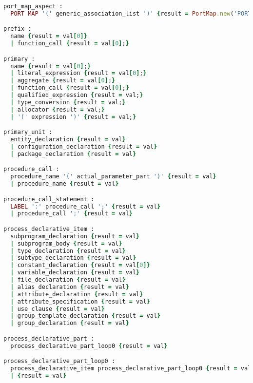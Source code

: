 \begin{lstlisting}[language=Ruby, style=rubystyle]
port_map_aspect :
  PORT MAP '(' generic_association_list ')' {result = PortMap.new('PORT', val[3]);}

prefix :
  name {result = val[0]}
  | function_call {result = val[0];}

primary :
  name {result = val[0];}
  | literal_expression {result = val[0];}
  | aggregate {result = val[0];}
  | function_call {result = val[0];}
  | qualified_expression {result = val;}
  | type_conversion {result = val;}
  | allocator {result = val;}
  | '(' expression ')' {result = val;}

primary_unit :
  entity_declaration {result = val}
  | configuration_declaration {result = val}
  | package_declaration {result = val}

procedure_call :
  procedure_name '(' actual_parameter_part ')' {result = val}
  | procedure_name {result = val}

procedure_call_statement :
  LABEL ':' procedure_call ';' {result = val}
  | procedure_call ';' {result = val}

process_declarative_item :
  subprogram_declaration {result = val}
  | subprogram_body {result = val}
  | type_declaration {result = val}
  | subtype_declaration {result = val}
  | constant_declaration {result = val[0]}
  | variable_declaration {result = val}
  | file_declaration {result = val}
  | alias_declaration {result = val}
  | attribute_declaration {result = val}
  | attribute_specification {result = val}
  | use_clause {result = val}
  | group_template_declaration {result = val}
  | group_declaration {result = val}

process_declarative_part :
  process_declarative_part_loop0 {result = val}

process_declarative_part_loop0 :
  process_declarative_item process_declarative_part_loop0 {result = val}
  | {result = val}



\end{lstlisting}
